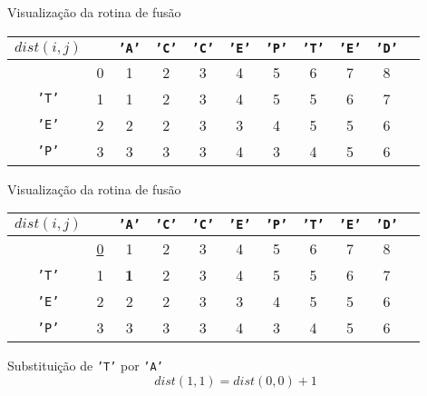 
\begin{frame}[fragile]{Visualização da rotina de fusão}

    \begin{table}
        \centering

        \begin{tabular}{c|cccccccccc} $dist(i, j)$ &
        & \textcolor{red!80!black}{\texttt{'A'}}
        & \textcolor{red!80!black}{\texttt{'C'}}
        & \textcolor{red!80!black}{\texttt{'C'}}
        & \textcolor{red!80!black}{\texttt{'E'}}
        & \textcolor{red!80!black}{\texttt{'P'}}
        & \textcolor{red!80!black}{\texttt{'T'}}
        & \textcolor{red!80!black}{\texttt{'E'}}
        & \textcolor{red!80!black}{\texttt{'D'}}\\
        \hline
&0 &1&2&3&4&5&6&7&8\\
\textcolor{red!80!black}{\texttt{'T'}}
&1 &1&2&3&4&5&5&6&7\\
\textcolor{red!80!black}{\texttt{'E'}}
&2 &2&2&3&3&4&5&5&6\\
\textcolor{red!80!black}{\texttt{'P'}}
&3 &3&3&3&4&3&4&5&6\\
        \end{tabular}

    \end{table}

\end{frame}

\begin{frame}[fragile]{Visualização da rotina de fusão}

    \begin{table}
        \centering

        \begin{tabular}{c|cccccccccc} $dist(i, j)$ &
        & \textcolor{red!80!black}{\texttt{'A'}}
        & \textcolor{red!80!black}{\texttt{'C'}}
        & \textcolor{red!80!black}{\texttt{'C'}}
        & \textcolor{red!80!black}{\texttt{'E'}}
        & \textcolor{red!80!black}{\texttt{'P'}}
        & \textcolor{red!80!black}{\texttt{'T'}}
        & \textcolor{red!80!black}{\texttt{'E'}}
        & \textcolor{red!80!black}{\texttt{'D'}}\\
        \hline
&\underline{0} &1&2&3&4&5&6&7&8\\
\textcolor{red!80!black}{\texttt{'T'}}
&1 &\textbf{1}&2&3&4&5&5&6&7\\
\textcolor{red!80!black}{\texttt{'E'}}
&2 &2&2&3&3&4&5&5&6\\
\textcolor{red!80!black}{\texttt{'P'}}
&3 &3&3&3&4&3&4&5&6\\
        \end{tabular}

    \end{table}

    Substituição de 
\textcolor{red!80!black}{\texttt{'T'}}
    por
\textcolor{red!80!black}{\texttt{'A'}}
    \[
        dist(1, 1) = dist(0, 0) + 1
    \]    

\end{frame}

